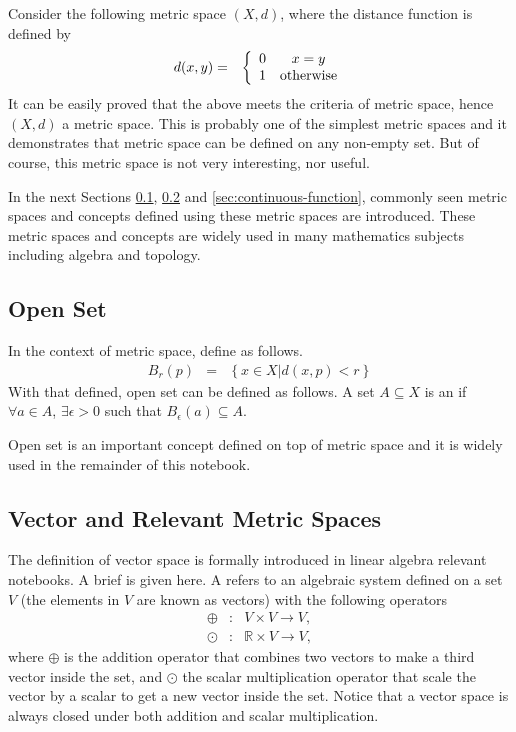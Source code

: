 Consider the following metric space $(X,d)$, where the distance function is defined by
\begin{eqnarray}
	d(x,y) &=& \left\{\begin{array}{cc}
		0 & x=y \\
		1 & \textup{otherwise}
	\end{array}\right.
\end{eqnarray}
It can be easily proved that the above meets the criteria of metric space, hence $(X,d)$ a metric space. This is probably one of the simplest metric spaces and it demonstrates that metric space can be defined on any non-empty set. But of course, this metric space is not very interesting, nor useful.

In the next Sections \ref{sec:open-set}, \ref{sec:p-norm} and \ref{sec:continuous-function}, commonly seen metric spaces and concepts defined using these metric spaces are introduced. These metric spaces and concepts are widely used in many mathematics subjects including algebra and topology. 

\subsection{Open Set} \label{sec:open-set}

In the context of metric space, define  as follows.
\begin{eqnarray}
	B_r(p) &=& \left\{x \in X | d(x,p) < r\right\} \nonumber
\end{eqnarray}
With that defined, open set can be defined as follows. A set $A \subseteq X$ is an  if $\forall a \in A$, $\exists \epsilon > 0$ such that $B_\epsilon(a) \subseteq A$.

Open set is an important concept defined on top of metric space and it is widely used in the remainder of this notebook.

\subsection{Vector and Relevant Metric Spaces} \label{sec:p-norm}

The definition of vector space is formally introduced in linear algebra relevant notebooks. A brief is given here. A  refers to an algebraic system defined on a set $V$ (the elements in $V$ are known as vectors) with the following operators
\begin{eqnarray}
	\oplus &:& V \times V \to V, \nonumber \\
	\odot &:& \mathbb{R} \times V \to V, \nonumber
\end{eqnarray}
where $\oplus$ is the addition operator that combines two vectors to make a third vector inside the set, and $\odot$ the scalar multiplication operator that scale the vector by a scalar to get a new vector inside the set. Notice that a vector space is always closed under both addition and scalar multiplication.

